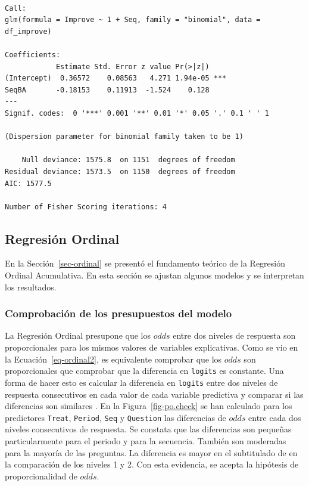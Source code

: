 \documentclass[
  12pt,
  a4paper,
  extrafontsizes,
  onecolumn,
  openright,
  table]{memoir}
\begin{document}
\begin{verbatim}

Call:
glm(formula = Improve ~ 1 + Seq, family = "binomial", data = df_improve)

Coefficients:
            Estimate Std. Error z value Pr(>|z|)    
(Intercept)  0.36572    0.08563   4.271 1.94e-05 ***
SeqBA       -0.18153    0.11913  -1.524    0.128    
---
Signif. codes:  0 '***' 0.001 '**' 0.01 '*' 0.05 '.' 0.1 ' ' 1

(Dispersion parameter for binomial family taken to be 1)

    Null deviance: 1575.8  on 1151  degrees of freedom
Residual deviance: 1573.5  on 1150  degrees of freedom
AIC: 1577.5

Number of Fisher Scoring iterations: 4
\end{verbatim}

\hypertarget{sec-ordinal-2}{%
\subsection{Regresión Ordinal}\label{sec-ordinal-2}}

En la Sección~\ref{sec-ordinal} se presentó el fundamento teórico de la
Regresión Ordinal Acumulativa. En esta sección se ajustan algunos
modelos y se interpretan los resultados.

\hypertarget{comprobaciuxf3n-de-los-presupuestos-del-modelo}{%
\subsubsection{Comprobación de los presupuestos del
modelo}\label{comprobaciuxf3n-de-los-presupuestos-del-modelo}}

La Regresión Ordinal presupone que los \(odds\) entre dos niveles de
respuesta son proporcionales para los mismos valores de variables
explicativas. Como se vio en la Ecuación~\ref{eq-ordinal2}, es
equivalente comprobar que los \(odds\) son proporcionales que comprobar
que la diferencia en \texttt{logits} es constante. Una forma de hacer
esto es calcular la diferencia en \texttt{logits} entre dos niveles de
respuesta consecutivos en cada valor de cada variable predictiva y
comparar si las diferencias son similares
\autocite[ver][pp.~315-316]{harrell2015}. En la
Figura~\ref{fig-po.check} se han calculado para los predictores
\texttt{Treat}, \texttt{Period}, \texttt{Seq} y \texttt{Question} las
diferencias de \(odds\) entre cada dos niveles consecutivos de
respuesta. Se constata que las diferencias son pequeñas particularmente
para el periodo y para la secuencia. También son moderadas para la
mayoría de las preguntas. La diferencia es mayor en el subtitulado de en
la comparación de los niveles 1 y 2. Con esta evidencia, se acepta la
hipótesis de proporcionalidad de \(odds\).
\end{document}

